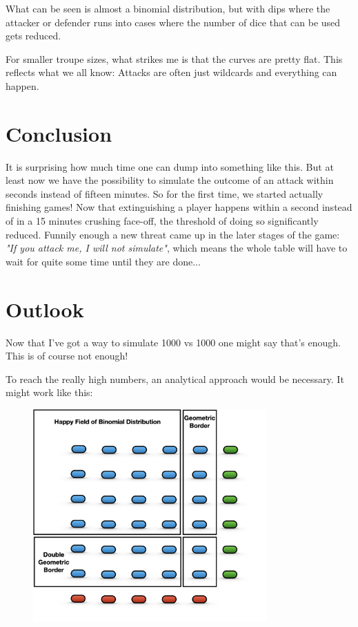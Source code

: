 \documentclass[11pt,a4paper]{article}
\begin{document}
    What can be seen is almost a binomial distribution, but with dips where the attacker or defender runs into cases where the number of dice that can be used gets reduced.

    For smaller troupe sizes, what strikes me is that the curves are pretty flat.
    This reflects what we all know: Attacks are often just wildcards and everything can happen.


    \section{Conclusion}
    It is surprising how much time one can dump into something like this.
    But at least now we have the possibility to simulate the outcome of an attack within seconds instead of fifteen minutes.
    So for the first time, we started actually finishing games!
    Now that extinguishing a player happens within a second instead of in a 15 minutes crushing face-off, the threshold of doing so significantly reduced.
    Funnily enough a new threat came up in the later stages of the game: \textit{"If you attack me, I will not simulate"}, which means the whole table will have to wait for quite some time until they are done...


    \section{Outlook}
    Now that I've got a way to simulate 1000 vs 1000 one might say that's enough.
    This is of course not enough!

    To reach the really high numbers, an analytical approach would be necessary.
    It might work like this:

    \begin{figure}[H]
        \centering
        \includegraphics[width=0.8\textwidth]{../images/Analytic Interpolation.png}
    \end{figure}
\end{document}
